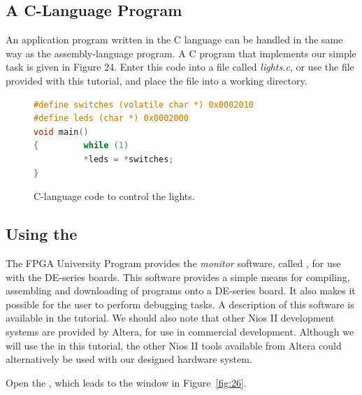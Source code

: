 \documentclass[11pt, twoside, pdftex]{article}
\begin{document}
\subsection{A C-Language Program}
An application program written in the C language can be handled in the same way as 
the assembly-language program. A C program that implements our simple task is 
given in Figure 24. Enter this code into a file called {\it lights.c},
or use the file provided with this tutorial, and place the file into a working directory. 
\\
\begin{figure}[H]
\begin{center}
\begin{lstlisting}[language=C]
#define switches (volatile char *) 0x0002010
#define leds (char *) 0x0002000
void main()
{         while (1)
          *leds = *switches;
}
\end{lstlisting}
\end{center}
	\caption{C-language code to control the lights.}
	\label{fig:25}
\end{figure}

\subsection{Using the \productNameMed{}}
The FPGA University Program provides the {\it monitor} software, called {\it \productNameMed{}}, 
for use with the DE-series boards. This software provides a simple means for compiling, assembling
and downloading of programs onto a DE-series board.
It also makes it possible for the user to perform debugging tasks.
A description of this software is available in the {\it \productNameMed{}} tutorial.
We should also note that other Nios II development systems are provided by Altera,
for use in commercial development.
Although we will use the \productNameMed{} in this tutorial, the other Nios II tools
available from Altera could alternatively be used with our designed hardware system.

Open the \productNameMed{}, which leads to the window in Figure~\ref{fig:26}.
~\\
\end{document}

